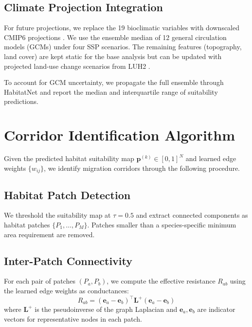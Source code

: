 \documentclass[11pt,a4paper]{article}
\begin{document}
\subsection{Climate Projection Integration}

For future projections, we replace the 19 bioclimatic variables with
downscaled CMIP6 projections \citep{eyring2016overview}. We use the
ensemble median of 12 general circulation models (GCMs) under four SSP
scenarios. The remaining features (topography, land cover) are kept
static for the base analysis but can be updated with projected land-use
change scenarios from LUH2 \citep{hurtt2020harmonization}.

To account for GCM uncertainty, we propagate the full ensemble through
HabitatNet and report the median and interquartile range of suitability
predictions.


\section{Corridor Identification Algorithm}
\label{sec:corridors}

Given the predicted habitat suitability map $\mathbf{p}^{(k)} \in
[0,1]^N$ and learned edge weights $\{w_{ij}\}$, we identify migration
corridors through the following procedure.

\subsection{Habitat Patch Detection}

We threshold the suitability map at $\tau = 0.5$ and extract connected
components as habitat patches $\{P_1, \ldots, P_M\}$. Patches smaller
than a species-specific minimum area requirement are removed.

\subsection{Inter-Patch Connectivity}

For each pair of patches $(P_a, P_b)$, we compute the effective
resistance $R_{ab}$ using the learned edge weights as conductances:
\begin{equation}
  R_{ab} = (\mathbf{e}_a - \mathbf{e}_b)^\top \mathbf{L}^{+}
  (\mathbf{e}_a - \mathbf{e}_b)
\end{equation}
where $\mathbf{L}^{+}$ is the pseudoinverse of the graph Laplacian and
$\mathbf{e}_a, \mathbf{e}_b$ are indicator vectors for representative
nodes in each patch.
\end{document}
